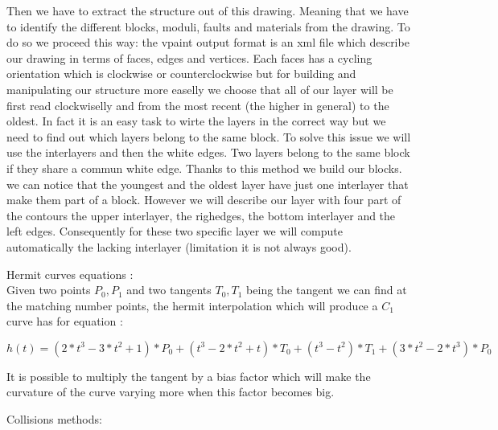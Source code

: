 \documentclass[12pt, a4paper]{memoir} %
\begin{document}
Then we have to extract the structure out of this drawing. Meaning that we have to identify the different blocks, moduli, faults and materials from the drawing. To do so we proceed this way: the vpaint output format is an xml file which describe our drawing in terms
of faces, edges and vertices. Each faces has a cycling orientation which is clockwise or counterclockwise but for building and manipulating our structure more easelly we choose that all of our layer will be first read clockwiselly and from the most recent (the higher in general) to the oldest. In fact it is an easy task to wirte the layers in the correct way but we need to find out which layers belong to the same block. To solve this issue we will use the interlayers and then the white edges. Two layers belong to the same block if they share a commun white edge. Thanks to this method we build our blocks. we can notice that the youngest and the oldest layer have just one interlayer that make them part of a block. However we will describe our layer with four part of the contours the upper interlayer, the righedges, the bottom interlayer and the left edges. Consequently for these two specific layer we will compute automatically the lacking interlayer (limitation it is not always good).
	

Hermit curves equations :\\
Given two points $P_0, P_1$ and two tangents $T_0, T_1$ being the tangent we can find at the matching number points, the hermit interpolation which will produce a $C_1$ curve has for equation : 


\begin{equation}
h(t) = (2*t^3 - 3*t^2 + 1)*P_0 + (t^3 - 2*t^2 + t)*T_0 + (t^3 -t^2)*T_1 +(3*t^2 - 2*t^3)*P_0
\end{equation}

It is possible to multiply the tangent by a bias factor which will make the curvature of the curve varying more when this factor becomes big.

Collisions methods: \\
\end{document}
